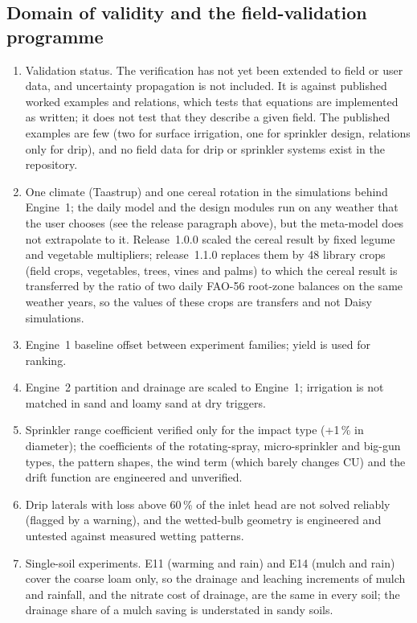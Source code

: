 

\subsection{Domain of validity and the field-validation programme}
\label{sec:validity}
\begin{enumerate}[nosep]
\item Validation status. The verification has not yet been extended to field or user data, and uncertainty propagation is not included. It is against published worked examples and relations, which tests that equations are implemented as written; it does not test that they describe a given field. The published examples are few (two for surface irrigation, one for sprinkler design, relations only for drip), and no field data for drip or sprinkler systems exist in the repository.
\item One climate (Taastrup) and one cereal rotation in the simulations behind Engine~1; the daily model and the design modules run on any weather that the user chooses (see the release paragraph above), but the meta-model does not extrapolate to it. Release~1.0.0 scaled the cereal result by fixed legume and vegetable multipliers; release~1.1.0 replaces them by 48 library crops (field crops, vegetables, trees, vines and palms) to which the cereal result is transferred by the ratio of two daily FAO-56 root-zone balances on the same weather years, so the values of these crops are transfers and not Daisy simulations.
\item Engine~1 baseline offset between experiment families; yield is used for ranking.
\item Engine~2 partition and drainage are scaled to Engine~1; irrigation is not matched in sand and loamy sand at dry triggers.
\item Sprinkler range coefficient verified only for the impact type (+1\,\% in diameter); the coefficients of the rotating-spray, micro-sprinkler and big-gun types, the pattern shapes, the wind term (which barely changes CU) and the drift function are engineered and unverified.
\item Drip laterals with loss above 60\,\% of the inlet head are not solved reliably (flagged by a warning), and the wetted-bulb geometry is engineered and untested against measured wetting patterns.
\item Single-soil experiments. E11 (warming and rain) and E14 (mulch and rain) cover the coarse loam only, so the drainage and leaching increments of mulch and rainfall, and the nitrate cost of drainage, are the same in every soil; the drainage share of a mulch saving is understated in sandy soils.

\end{enumerate}
